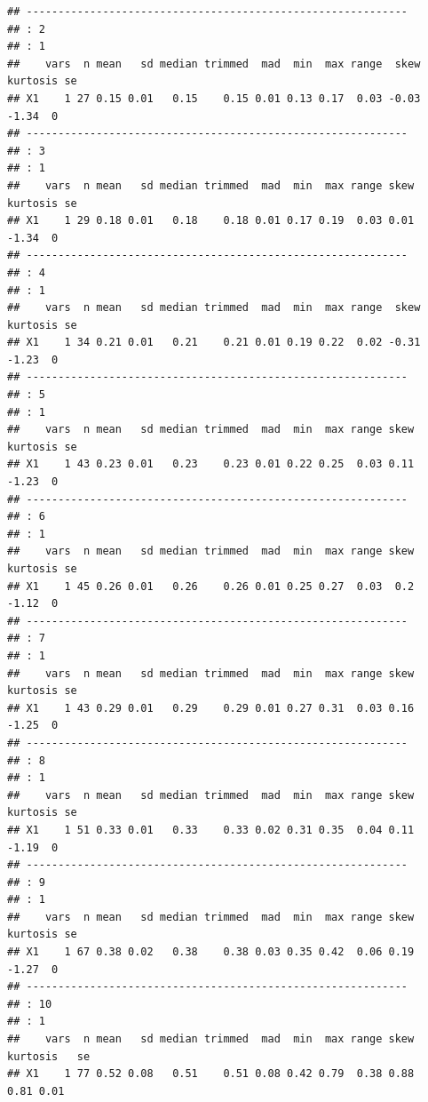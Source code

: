 \documentclass[
  10pt,
]{book}
\begin{document}
\begin{verbatim}
## ------------------------------------------------------------ 
## : 2
## : 1
##    vars  n mean   sd median trimmed  mad  min  max range  skew kurtosis se
## X1    1 27 0.15 0.01   0.15    0.15 0.01 0.13 0.17  0.03 -0.03    -1.34  0
## ------------------------------------------------------------ 
## : 3
## : 1
##    vars  n mean   sd median trimmed  mad  min  max range skew kurtosis se
## X1    1 29 0.18 0.01   0.18    0.18 0.01 0.17 0.19  0.03 0.01    -1.34  0
## ------------------------------------------------------------ 
## : 4
## : 1
##    vars  n mean   sd median trimmed  mad  min  max range  skew kurtosis se
## X1    1 34 0.21 0.01   0.21    0.21 0.01 0.19 0.22  0.02 -0.31    -1.23  0
## ------------------------------------------------------------ 
## : 5
## : 1
##    vars  n mean   sd median trimmed  mad  min  max range skew kurtosis se
## X1    1 43 0.23 0.01   0.23    0.23 0.01 0.22 0.25  0.03 0.11    -1.23  0
## ------------------------------------------------------------ 
## : 6
## : 1
##    vars  n mean   sd median trimmed  mad  min  max range skew kurtosis se
## X1    1 45 0.26 0.01   0.26    0.26 0.01 0.25 0.27  0.03  0.2    -1.12  0
## ------------------------------------------------------------ 
## : 7
## : 1
##    vars  n mean   sd median trimmed  mad  min  max range skew kurtosis se
## X1    1 43 0.29 0.01   0.29    0.29 0.01 0.27 0.31  0.03 0.16    -1.25  0
## ------------------------------------------------------------ 
## : 8
## : 1
##    vars  n mean   sd median trimmed  mad  min  max range skew kurtosis se
## X1    1 51 0.33 0.01   0.33    0.33 0.02 0.31 0.35  0.04 0.11    -1.19  0
## ------------------------------------------------------------ 
## : 9
## : 1
##    vars  n mean   sd median trimmed  mad  min  max range skew kurtosis se
## X1    1 67 0.38 0.02   0.38    0.38 0.03 0.35 0.42  0.06 0.19    -1.27  0
## ------------------------------------------------------------ 
## : 10
## : 1
##    vars  n mean   sd median trimmed  mad  min  max range skew kurtosis   se
## X1    1 77 0.52 0.08   0.51    0.51 0.08 0.42 0.79  0.38 0.88     0.81 0.01
\end{verbatim}
\end{document}
